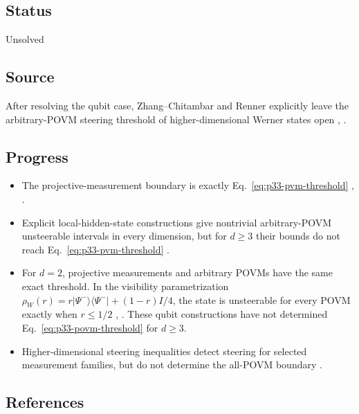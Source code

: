 \subsection*{Status}

Unsolved

\subsection*{Source}

After resolving the qubit case, Zhang--Chitambar and Renner explicitly leave
the arbitrary-POVM steering threshold of higher-dimensional Werner states
open ,
.

\subsection*{Progress}

\begin{itemize}
  \item The projective-measurement boundary is exactly
  Eq.~\eqref{eq:p33-pvm-threshold}
  ,
  .

  \item Explicit local-hidden-state constructions give nontrivial
  arbitrary-POVM unsteerable intervals in every dimension, but for $d\geq3$
  their bounds do not reach Eq.~\eqref{eq:p33-pvm-threshold}
  .

  \item For $d=2$, projective measurements and arbitrary POVMs have the same
  exact threshold.  In the visibility parametrization
  $\rho_W(r)=r\lvert\Psi^-\rangle\!\langle\Psi^-\rvert+(1-r)I/4$, the state
  is unsteerable for every POVM exactly when $r\leq1/2$
  ,
  .  These qubit constructions have not
  determined Eq.~\eqref{eq:p33-povm-threshold} for $d\geq3$.

  \item Higher-dimensional steering inequalities detect steering for
  selected measurement families, but do not determine the all-POVM boundary
  .
\end{itemize}

\subsection*{References}

